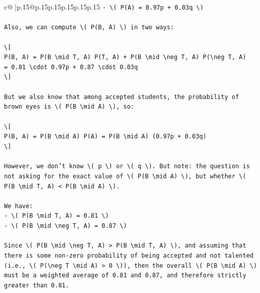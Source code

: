 \documentclass{article}
\begin{document}
{\begin{supertabular}{c@{$\;$}|p{.15\linewidth}@{}p{.15\linewidth}p{.15\linewidth}p{.15\linewidth}p{.15\linewidth}p{.15\linewidth}}
{{{\texttt{{-} \textbackslash{}( P(A) = 0.97p + 0.03q \textbackslash{})} \\
\\ 
\texttt{Also, we can compute \textbackslash{}( P(B, A) \textbackslash{}) in two ways:} \\
\\ 
\texttt{\textbackslash{}{[}} \\
\texttt{P(B, A) = P(B \textbackslash{}mid T, A) P(T, A) + P(B \textbackslash{}mid \textbackslash{}neg T, A) P(\textbackslash{}neg T, A)} \\
\texttt{= 0.81 \textbackslash{}cdot 0.97p + 0.87 \textbackslash{}cdot 0.03q} \\
\texttt{\textbackslash{}{]}} \\
\\ 
\texttt{But we also know that among accepted students, the probability of brown eyes is \textbackslash{}( P(B \textbackslash{}mid A) \textbackslash{}), so:} \\
\\ 
\texttt{\textbackslash{}{[}} \\
\texttt{P(B, A) = P(B \textbackslash{}mid A) P(A) = P(B \textbackslash{}mid A) (0.97p + 0.03q)} \\
\texttt{\textbackslash{}{]}} \\
\\ 
\texttt{However, we don’t know \textbackslash{}( p \textbackslash{}) or \textbackslash{}( q \textbackslash{}). But note: the question is not asking for the exact value of \textbackslash{}( P(B \textbackslash{}mid A) \textbackslash{}), but whether \textbackslash{}( P(B \textbackslash{}mid T, A) < P(B \textbackslash{}mid A) \textbackslash{}).} \\
\\ 
\texttt{We have:} \\
\texttt{{-} \textbackslash{}( P(B \textbackslash{}mid T, A) = 0.81 \textbackslash{})} \\
\texttt{{-} \textbackslash{}( P(B \textbackslash{}mid \textbackslash{}neg T, A) = 0.87 \textbackslash{})} \\
\\ 
\texttt{Since \textbackslash{}( P(B \textbackslash{}mid \textbackslash{}neg T, A) > P(B \textbackslash{}mid T, A) \textbackslash{}), and assuming that there is some non{-}zero probability of being accepted and not talented (i.e., \textbackslash{}( P(\textbackslash{}neg T \textbackslash{}mid A) > 0 \textbackslash{})), then the overall \textbackslash{}( P(B \textbackslash{}mid A) \textbackslash{}) must be a weighted average of 0.81 and 0.87, and therefore strictly greater than 0.81.} \\
}}}
\end{supertabular}}
\end{document}
